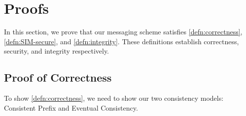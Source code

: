 \section{Proofs}
In this section, we prove that our messaging scheme satisfies \cref{defn:correctness}, \cref{defn:SIM-secure}, and \cref{defn:integrity}. These definitions establish correctness, security, and integrity respectively.
\subsection{Proof of Correctness}
To show \cref{defn:correctness}, we need to show our two consistency models: Consistent Prefix and Eventual Consistency.